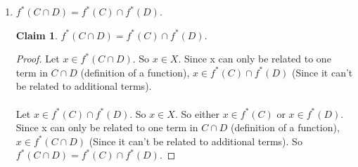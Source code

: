 \documentclass[11pt]{letter}
\theoremstyle{definition}
\newtheorem{claim}{Claim}
\begin{document}
\begin{description}
\begin{enumerate}
\begin{enumerate}
                                  
				\item $f^*(C\cap D)=f^*(C)\cap f^*(D)$.
                                  \begin{claim}
                                    $f^*(C\cap D)=f^*(C)\cap f^*(D)$.
                                  \end{claim}
                                  \begin{proof}
                                    Let $x\in f^*(C\cap D)$. So $x\in X$. Since x can only be related to one term in $C\cap D$ (definition of a function), $x\in f^*(C)\cap f^*(D)$ (Since it can't be related to additional terms).\\ \\
                                    Let $x\in f^*(C)\cap f^*(D)$. So $x\in X$. So either $x\in f^*(C)$ or $x\in f^*(D)$. Since x can only be related to one term in $C\cap D$ (definition of a function), $x\in f^*(C\cap D)$ (Since it can't be related to additional terms). So $f^*(C\cap D)=f^*(C)\cap f^*(D)$.
                                  \end{proof}
                                  

\end{enumerate}
\end{enumerate}
\end{description}
\end{document}
